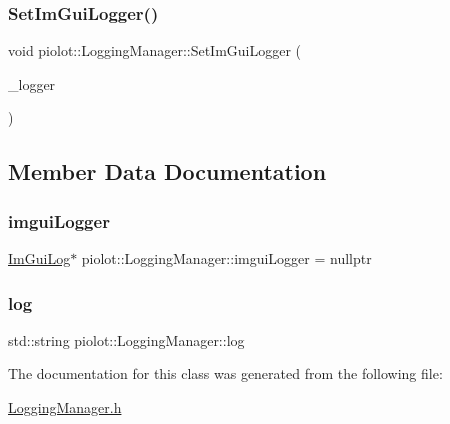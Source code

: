 \subsubsection{\texorpdfstring{Set\+Im\+Gui\+Logger()}{SetImGuiLogger()}}
{\footnotesize\ttfamily void piolot\+::\+Logging\+Manager\+::\+Set\+Im\+Gui\+Logger (\begin{DoxyParamCaption}\item[{\mbox{\hyperlink{structpiolot_1_1_im_gui_log}{Im\+Gui\+Log}} $\ast$}]{\+\_\+logger }\end{DoxyParamCaption})\hspace{0.3cm}{\ttfamily [inline]}}



\subsection{Member Data Documentation}
\mbox{\label{classpiolot_1_1_logging_manager_a931c51fe236e3856d28b450d250cea8d}} 
\subsubsection{\texorpdfstring{imgui\+Logger}{imguiLogger}}
{\footnotesize\ttfamily \mbox{\hyperlink{structpiolot_1_1_im_gui_log}{Im\+Gui\+Log}}$\ast$ piolot\+::\+Logging\+Manager\+::imgui\+Logger = nullptr\hspace{0.3cm}{\ttfamily [private]}}

\mbox{\label{classpiolot_1_1_logging_manager_a09a47d777f82d02c4420fc1832317e2b}} 
\subsubsection{\texorpdfstring{log}{log}}
{\footnotesize\ttfamily std\+::string piolot\+::\+Logging\+Manager\+::log\hspace{0.3cm}{\ttfamily [private]}}



The documentation for this class was generated from the following file\+:\begin{DoxyCompactItemize}
\item 
\mbox{\hyperlink{_logging_manager_8h}{Logging\+Manager.\+h}}\end{DoxyCompactItemize}
